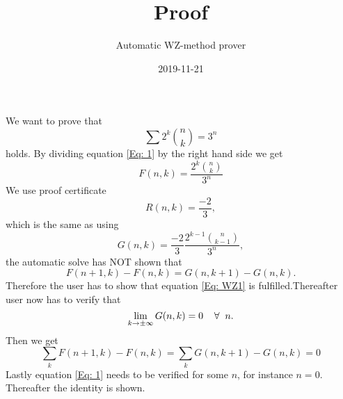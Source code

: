 \documentclass{article}
\title{Proof}
\author{Automatic WZ-method prover}
\date{2019-11-21}
\let\oldforall\forall
\renewcommand{\forall}{\hspace*{2mm}\oldforall\hspace*{1mm}}
\begin{document}
\maketitle
We want to prove that
\begin{equation}\label{Eq: 1}
\sum 2^k\binom{n}{k} = 3^n
\end{equation}
holds. By dividing equation \ref{Eq: 1} by the right hand side we get
\begin{equation}
F(n,k)=\frac{2^{k}\binom{n}{k}}{3^{n}}
\end{equation}
We use proof certificate
\begin{equation}
R(n,k)=\frac{-2}{3},
\end{equation}
which is the same as using
\begin{equation}
G(n,k)=\frac{-2}{3}\frac{2^{k-1}\binom{n}{k-1}}{3^{n}},
\end{equation}
the automatic solve has NOT shown that
\begin{equation}\label{Eq: WZ1}
F(n+1,k)-F(n,k)=G(n,k+1)-G(n,k).
\end{equation}
Therefore the user has to show that equation \ref{Eq: WZ1} is fulfilled.Thereafter user now has to verify that
\begin{equation}
\lim_{k\to\pm\infty}G(n,k)=0\forall n.
\end{equation}
Then we get
\begin{equation}
\sum_k F(n+1,k)-F(n,k)=\sum_k G(n,k+1)-G(n,k)=0\end{equation}Lastly equation \ref{Eq: 1} needs to be verified for some $n$, for instance $n=0$. Thereafter the identity is shown.
\end{document}
